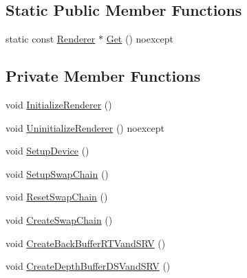 \subsection*{Static Public Member Functions}
\begin{DoxyCompactItemize}
\item 
static const \hyperlink{classmage_1_1_renderer}{Renderer} $\ast$ \hyperlink{classmage_1_1_renderer_a84ad465ae4ecfa2c0e9334cadb82d269}{Get} () noexcept
\end{DoxyCompactItemize}
\subsection*{Private Member Functions}
\begin{DoxyCompactItemize}
\item 
void \hyperlink{classmage_1_1_renderer_a2bb7f4e41ef6db047ce3023ed4e5d0c1}{Initialize\+Renderer} ()
\item 
void \hyperlink{classmage_1_1_renderer_a28c76b49e51e49e58fdeb0b72b12f3b6}{Uninitialize\+Renderer} () noexcept
\item 
void \hyperlink{classmage_1_1_renderer_aedf5e2e3f73d3d05c09c5fc9f8ac06c3}{Setup\+Device} ()
\item 
void \hyperlink{classmage_1_1_renderer_a8d3030611390f69120f1e5b91225eddf}{Setup\+Swap\+Chain} ()
\item 
void \hyperlink{classmage_1_1_renderer_a1c4615559503b339a9cdc6ac17e1e858}{Reset\+Swap\+Chain} ()
\item 
void \hyperlink{classmage_1_1_renderer_a1bd77bf54ea3a7867691785efd183013}{Create\+Swap\+Chain} ()
\item 
void \hyperlink{classmage_1_1_renderer_a07a727853102d747677d61dec379f58e}{Create\+Back\+Buffer\+R\+T\+Vand\+S\+RV} ()
\item 
void \hyperlink{classmage_1_1_renderer_afe5bf4339a31eda5a14d1da48fcfe0e9}{Create\+Depth\+Buffer\+D\+S\+Vand\+S\+RV} ()
\end{DoxyCompactItemize}
